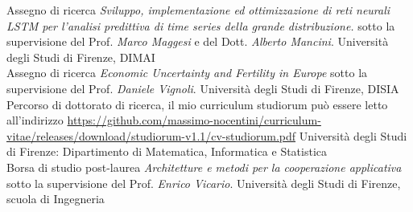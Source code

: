 \documentclass[totpages,openbib,italian]{europecv}
\begin{document}


\begin{europecv}
\ecvpersonalinfo[20pt]



{Assegno di ricerca \emph{Sviluppo, implementazione ed ottimizzazione di reti neurali LSTM per l’analisi predittiva di time series della grande distribuzione.} sotto la supervisione del
Prof. \emph{Marco Maggesi} e del Dott. \emph{Alberto Mancini}.}
 {Universit\`a degli Studi di Firenze, DIMAI}
\\
{Assegno di ricerca \emph{Economic Uncertainty and Fertility in Europe} sotto la supervisione del
 Prof. \emph{Daniele Vignoli}.}
 {Universit\`a degli Studi di Firenze, DISIA}
\\
{Percorso di dottorato di ricerca, il mio curriculum studiorum pu\`o essere letto all'indirizzo
\url{https://github.com/massimo-nocentini/curriculum-vitae/releases/download/studiorum-v1.1/cv-studiorum.pdf}}
{Universit\`a degli Studi di Firenze: Dipartimento di Matematica, Informatica e Statistica}
\\
{Borsa di studio post-laurea \emph{Architetture e metodi
 per la cooperazione applicativa} sotto la supervisione del Prof. \emph{Enrico Vicario}.}
{Universit\`a degli Studi di Firenze, scuola di Ingegneria}



\end{europecv}
\end{document}
